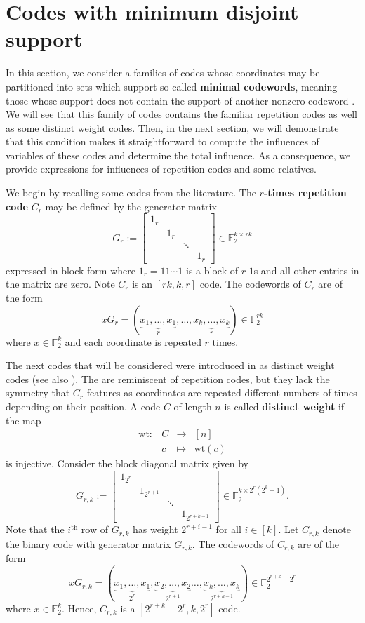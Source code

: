 \documentclass[12pt]{article}
\newcommand{\F}{\mathbb{F}}
\newcommand{\wt}{\mathrm{wt}}
\def\F{\mathbb F}
\theoremstyle{definition}
\begin{document}
\section{Codes with minimum disjoint support} \label{min_section}

In this section, we consider a families of codes 
whose coordinates may be partitioned into sets which support so-called {\bf minimal codewords}, meaning those whose support does not contain the support of another nonzero codeword \cite{minimal}. We will see that this family of codes contains the familiar repetition codes as well as some distinct weight codes. Then, in the next section, we will demonstrate that this condition makes it straightforward to compute the influences of variables of these codes and determine the total influence. As a consequence, we provide expressions for influences of repetition codes and some relatives. 

We begin by recalling some codes from the literature. The {\bf $r$-times repetition code} $C_r$ may be defined by the generator matrix
$$G_{r}:= \left[ 
\begin{array}{cccc}
1_{r} &  & & \\
& 1_{r} & & \\
& & \ddots & \\
& & & 1_{r} 
\end{array}
\right] \in \F_2^{k \times rk}$$
expressed in block form where $1_r = 1 1 \cdots 1$ is a block of $r$ $1$s and all other entries in the matrix are zero. Note $C_r$ is an $[rk,k,r]$ code. The codewords of $C_r$ are of the form
$$x G_r = (\underbrace{x_1, \dots, x_1}_r, \dots, \underbrace{x_k, \dots, x_k}_r) \in \F_2^{rk}$$ where $x \in \F_2^k$ and each coordinate is repeated $r$ times. 

The next codes that will be considered were introduced in \cite{HH} as distinct weight codes (see also \cite{how_many}). 
The are reminiscent of repetition codes, but they lack the symmetry that $C_r$ features as coordinates are repeated different numbers of times depending on their position. A code $C$ of length $n$ is called {\bf distinct weight} if the map
$$
\begin{array}{cccc}
\wt: &C &\rightarrow& [n] \\
&c &\mapsto & \wt(c)
\end{array}
$$ 
is injective. Consider the block diagonal matrix given by 
$$G_{r,k}:= \left[ 
\begin{array}{cccc}
1_{2^r} &  & & \\
& 1_{2^{r+1}} & & \\
& & \ddots & \\
& & & 1_{2^{r+k-1}} 
\end{array}
\right]  \in \F_2^{k \times 2^r (2^{k}-1)}.$$
Note that the $i^\text{th}$ row of $G_{r,k}$ has weight $2^{r+i-1}$ for all $i \in [k]$. Let $C_{r,k}$ denote the binary code with generator matrix $G_{r,k}$. The codewords of $C_{r,k}$ are of the form
$$x G_{r,k} = (\underbrace{x_1, \dots, x_1}_{2^r}, \underbrace{x_2, \dots, x_2}_{2^{r+1}} \dots, \underbrace{x_k, \dots, x_k}_{2^{r+k-1}}) \in \F_2^{2^{r+k}-2^r}$$ where $x \in \F_2^k$. Hence, $C_{r,k}$ is a $[2^{r+k}-2^r,k,2^r]$ code. 
\end{document}
